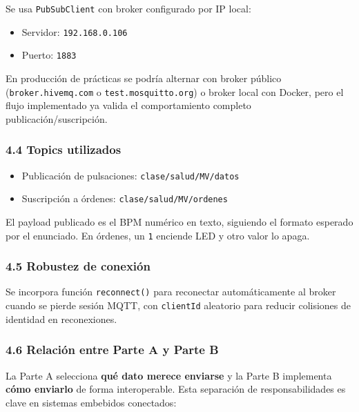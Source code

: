 \documentclass[11pt]{article}
\providecommand{\tightlist}{%
      \setlength{\itemsep}{0pt}\setlength{\parskip}{0pt}}
\begin{document}
Se usa \texttt{PubSubClient} con broker configurado por IP local:

\begin{itemize}
\tightlist
\item
  Servidor: \texttt{192.168.0.106}
\item
  Puerto: \texttt{1883}
\end{itemize}

En producción de prácticas se podría alternar con broker público
(\texttt{broker.hivemq.com} o \texttt{test.mosquitto.org}) o broker
local con Docker, pero el flujo implementado ya valida el comportamiento
completo publicación/suscripción.

\subsubsection{4.4 Topics utilizados}\label{topics-utilizados}

\begin{itemize}
\tightlist
\item
  Publicación de pulsaciones: \texttt{clase/salud/MV/datos}
\item
  Suscripción a órdenes: \texttt{clase/salud/MV/ordenes}
\end{itemize}

El payload publicado es el BPM numérico en texto, siguiendo el formato
esperado por el enunciado. En órdenes, un
\texttt{\textquotesingle{}1\textquotesingle{}} enciende LED y otro valor
lo apaga.

\subsubsection{4.5 Robustez de conexión}\label{robustez-de-conexiuxf3n}

Se incorpora función \texttt{reconnect()} para reconectar
automáticamente al broker cuando se pierde sesión MQTT, con
\texttt{clientId} aleatorio para reducir colisiones de identidad en
reconexiones.

\subsubsection{4.6 Relación entre Parte A y Parte
B}\label{relaciuxf3n-entre-parte-a-y-parte-b}

La Parte A selecciona \textbf{qué dato merece enviarse} y la Parte B
implementa \textbf{cómo enviarlo} de forma interoperable. Esta
separación de responsabilidades es clave en sistemas embebidos
conectados:
\end{document}
